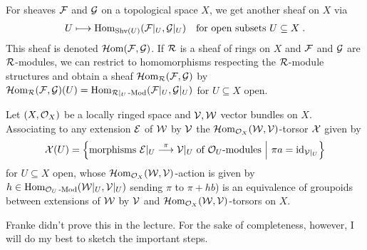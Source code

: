 \documentclass[a4paper,parskip=half,numbers=enddot, DIV=12]{scrreprt}
\begin{document}
For sheaves $\mathcal{F}$ and $\mathcal{G}$ on a topological space $X$, we get another sheaf on $X$ via 
\begin{align*}
	U\longmapsto \operatorname{Hom}_{\operatorname{Shv}(U)}(\mathcal{F}|_U,\mathcal{G}|_U)\quad\text{for open subsets }U\subseteq X\;.
\end{align*}
This sheaf is denoted $\operatorname{\mathcal{H} om}(\mathcal{F},\mathcal{G})$. If $\mathcal{R}$ is  a sheaf of rings on $X$ and $\mathcal{F}$ and $\mathcal{G}$ are $\mathcal{R}$-modules, we can restrict to homomorphisms respecting the $\mathcal{R}$-module structures and obtain a sheaf $\operatorname{\mathcal{H} om}_{\mathcal{R}}(\mathcal{F},\mathcal{G})$ by $\operatorname{\mathcal{H} om}_{\mathcal{R}}(\mathcal{F},\mathcal{G})(U)=\operatorname{Hom}_{\mathcal{R}|_U\operatorname{-Mod}}(\mathcal{F}|_U,\mathcal{G}|_U)$ for $U\subseteq X$ open.
\begin{prop}
	Let $(X,\mathcal{O}_X)$ be a locally ringed space and $\mathcal{V},\mathcal{W}$ vector bundles on $X$. Associating to any extension $\mathcal{E}$ of $\mathcal{W}$ by $\mathcal{V}$ the $\operatorname{\mathcal{H} om}_{\mathcal{O}_X}(\mathcal{W},\mathcal{V})$-torsor $\mathcal{X}$ given by
	\begin{align*}
		\Xx(U)=\left\{\text{morphisms }\Ee|_U\morphism[\pi]\Vv|_U\text{ of }\Oo_U\text{-modules}\st \pi a=\id_{\Vv|_U}\right\}
	\end{align*}
	for $U\subseteq X$ open, whose $\operatorname{\mathcal{H} om}_{\mathcal{O}_X}(\mathcal{W},\mathcal{V})$-action is given by $h\in\operatorname{Hom}_{\mathcal{O}_U\operatorname{-Mod}}(\mathcal{W}|_U,\mathcal{V}|_U)$ sending $\pi$ to $\pi+h b$) is an equivalence of groupoids between extensions of $\mathcal{W}$ by $\mathcal{V}$ and $\operatorname{\mathcal{H} om}_{\mathcal{O}_X}(\mathcal{W},\mathcal{V})$-torsors on $X$.
\end{prop}
Franke didn't prove this in the lecture. For the sake of completeness, however, I will do my best to sketch the important steps.
\end{document}
